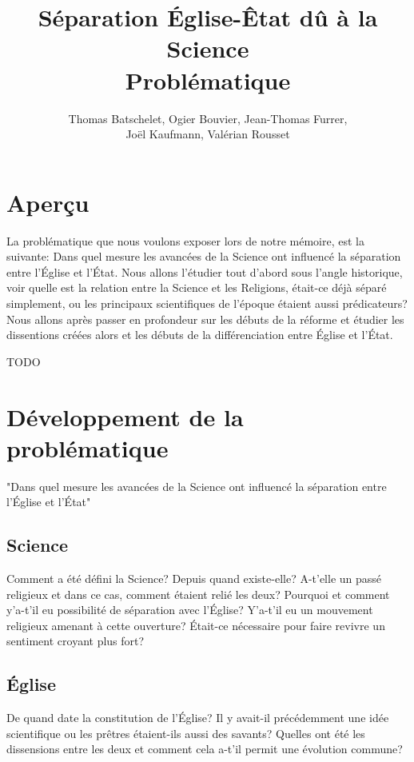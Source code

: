 \documentclass{article}
\title{S\'eparation \'Eglise-\^Etat d\^u \`a la Science \\
	\large{Probl\'ematique}}
\author{Thomas Batschelet, Ogier Bouvier, Jean-Thomas Furrer, \\ Jo\"el Kaufmann, Val\'erian Rousset}
\begin{document}
\maketitle

\section{Aper\c{c}u}

La probl\'ematique que nous voulons exposer lors de notre m\'emoire, est la
suivante: Dans quel mesure les avanc\'ees de la Science ont influenc\'e la s\'eparation
entre l'\'Eglise et l'\'Etat. Nous allons l'\'etudier tout d'abord sous l'angle
historique, voir quelle est la relation entre la Science et les Religions,
\'etait-ce d\'ej\`a s\'epar\'e simplement, ou les principaux scientifiques de l'\'epoque
\'etaient aussi pr\'edicateurs? Nous allons apr\`es passer en profondeur sur les
d\'ebuts de la r\'eforme et \'etudier les dissentions cr\'e\'ees alors et les d\'ebuts de
la diff\'erenciation entre Église et l'État.

TODO

\section{D\'eveloppement de la probl\'ematique}

"Dans quel mesure les avanc\'ees de la Science ont influenc\'e la s\'eparation
entre l'\'Eglise et l'\'Etat"

\subsection{Science}

Comment a \'et\'e d\'efini la Science? Depuis quand existe-elle? A-t'elle un pass\'e
religieux et dans ce cas, comment \'etaient reli\'e les deux? Pourquoi et comment
y'a-t'il eu possibilit\'e de s\'eparation avec l'Église? Y'a-t'il eu un mouvement
religieux amenant \`a cette ouverture? Était-ce n\'ecessaire pour faire revivre un
sentiment croyant plus fort?

\subsection{Église}

De quand date la constitution de l'Église? Il y avait-il pr\'ec\'edemment une id\'ee
scientifique ou les pr\^etres \'etaient-ils aussi des savants? Quelles ont \'et\'e les
dissensions entre les deux et comment cela a-t'il permit une \'evolution commune?
\end{document}
